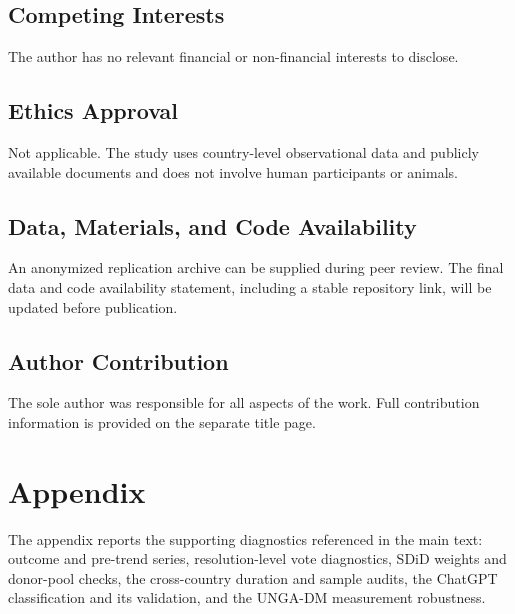 \documentclass[referee,pdflatex,sn-basic]{sn-jnl}
\theoremstyle{thmstylethree}
\begin{document}
\subsection*{Competing Interests}\label{competing-interests}

The author has no relevant financial or non-financial interests to disclose.

\subsection*{Ethics Approval}\label{ethics-approval}

Not applicable. The study uses country-level observational data and publicly available documents and does not involve human participants or animals.

\subsection*{Data, Materials, and Code Availability}\label{data-materials-and-code-availability}

An anonymized replication archive can be supplied during peer review. The final data and code availability statement, including a stable repository link, will be updated before publication.

\subsection*{Author Contribution}\label{author-contribution}

The sole author was responsible for all aspects of the work. Full contribution information is provided on the separate title page.

\clearpage



\clearpage

\appendix

\section*{Appendix}\label{appendix}

The appendix reports the supporting diagnostics referenced in the main text: outcome and pre-trend series, resolution-level vote diagnostics, SDiD weights and donor-pool checks, the cross-country duration and sample audits, the ChatGPT classification and its validation, and the UNGA-DM measurement robustness.
\end{document}
